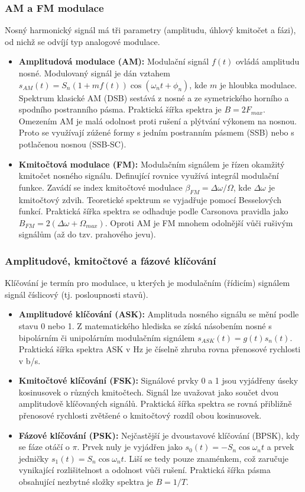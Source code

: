     \subsubsection{AM a FM modulace} Nosný harmonický signál má tři parametry (amplitudu, úhlový kmitočet a fázi), od nichž se odvíjí typ analogové modulace.

        \begin{itemize}
            \item \textbf{Amplitudová modulace (AM):} Modulační signál $f(t)$ ovládá amplitudu nosné. Modulovaný signál je dán vztahem $s_{AM}(t) = S_n(1 + m f(t))\cos(\omega_n t + \phi_n)$, kde $m$ je hloubka modulace. Spektrum klasické AM (DSB) sestává z nosné a ze symetrického horního a spodního postranního pásma. Praktická šířka spektra je $B = 2F_{max}$. Omezením AM je malá odolnost proti rušení a plýtvání výkonem na nosnou. Proto se využívají zúžené formy s jedním postranním pásmem (SSB) nebo s potlačenou nosnou (SSB-SC).
            \item \textbf{Kmitočtová modulace (FM):} Modulačním signálem je řízen okamžitý kmitočet nosného signálu. Definující rovnice využívá integrál modulační funkce. Zavádí se index kmitočtové modulace $\beta_{FM} = \Delta\omega / \Omega$, kde $\Delta\omega$ je kmitočtový zdvih. Teoretické spektrum se vyjadřuje pomocí Besselových funkcí. Praktická šířka spektra se odhaduje podle Carsonova pravidla jako $B_{FM} = 2(\Delta\omega + \Omega_{max})$. Oproti AM je FM mnohem odolnější vůči rušivým signálům (až do tzv. prahového jevu).
        \end{itemize}
    \subsubsection{Amplitudové, kmitočtové a fázové klíčování} 
        Klíčování je termín pro modulace, u kterých je modulačním (řídicím) signálem signál číslicový (tj. posloupnosti stavů).

        \begin{itemize}
            \item \textbf{Amplitudové klíčování (ASK):} Amplituda nosného signálu se mění podle stavu 0 nebo 1. Z matematického hlediska se získá násobením nosné s bipolárním či unipolárním modulačním signálem $s_{ASK}(t) = g(t)s_n(t)$. Praktická šířka spektra ASK v Hz je číselně zhruba rovna přenosové rychlosti v b/s.
            \item \textbf{Kmitočtové klíčování (FSK):} Signálové prvky 0 a 1 jsou vyjádřeny úseky kosinusovek o různých kmitočtech. Signál lze uvažovat jako součet dvou amplitudově klíčovaných signálů. Praktická šířka spektra se rovná přibližně přenosové rychlosti zvětšené o kmitočtový rozdíl obou kosinusovek.
            \item \textbf{Fázové klíčování (PSK):} Nejčastější je dvoustavové klíčování (BPSK), kdy se fáze otáčí o $\pi$. Prvek nuly je vyjádřen jako $s_0(t) = -S_n \cos \omega_n t$ a prvek jedničky $s_1(t) = S_n \cos \omega_n t$. Liší se tedy pouze znaménkem, což zaručuje vynikající rozlišitelnost a odolnost vůči rušení. Praktická šířka pásma obsahující nezbytné složky spektra je $B = 1/T$.
        \end{itemize}
    
        	    
        